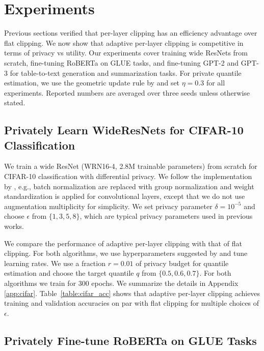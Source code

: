 \section{Experiments}\label{sec:experiment}

Previous sections verified that per-layer clipping has an efficiency advantage over flat clipping. 
We now show that adaptive per-layer clipping is competitive in terms of privacy vs utility.
Our experiments cover training wide ResNets from scratch, fine-tuning RoBERTa on GLUE tasks, and fine-tuning GPT-2 and GPT-3 for table-to-text generation and summarization tasks. For private quantile estimation, we use the geometric update rule by \cite{andrew2019differentially} and set $\eta=0.3$ for all experiments.
Reported numbers are averaged over three seeds unless otherwise stated.



\subsection{Privately Learn WideResNets for CIFAR-10 Classification}\label{subsec:cifar10}

We train a wide ResNet (WRN16-4, 2.8M trainable parameters) \citep{zagoruyko2016wide} from scratch for CIFAR-10 classification with differential privacy. We follow the implementation by  \cite{de2022unlocking}, e.g.,  batch normalization are replaced with group normalization and weight standardization is applied for convolutional layers, except that we do not use augmentation multiplicity for simplicity.
We set privacy parameter $\delta= 10^{-5}$ and choose $\epsilon$ from $\{1,3,5,8\}$, which are typical privacy parameters used in previous works.

We compare the performance of adaptive per-layer clipping with that of flat clipping. 
For both algorithms, we use  hyperparameters suggested by \cite{de2022unlocking}  and tune learning rates. %
We use a fraction $r=0.01$ of privacy budget for quantile estimation and choose the target quantile $q$ from $\{0.5, 0.6, 0.7\}$. For both algorithms we train for 300 epochs. 
We summarize the details in Appendix \ref{app:cifar}.  
Table~\ref{table:cifar_acc} shows that adaptive per-layer clipping achieves  training and validation accuracies on par with flat clipping for multiple choices of $\epsilon$. %




\subsection{Privately Fine-tune RoBERTa on GLUE Tasks} \label{subsec:roberta}

